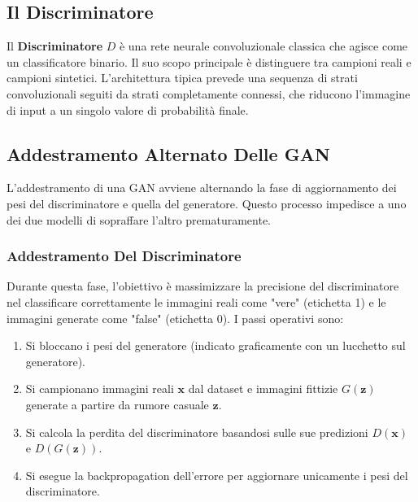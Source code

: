 ﻿\documentclass[11pt, a4paper]{article}
\begin{document}

\subsection{Il Discriminatore}

Il \textbf{Discriminatore} $D$ è una rete neurale convoluzionale classica che agisce come un classificatore binario. Il suo scopo principale è distinguere tra campioni reali e campioni sintetici. L'architettura tipica prevede una sequenza di strati convoluzionali seguiti da strati completamente connessi, che riducono l'immagine di input a un singolo valore di probabilità finale.


\subsection{Addestramento Alternato Delle GAN}

L'addestramento di una GAN avviene alternando la fase di aggiornamento dei pesi del discriminatore e quella del generatore. Questo processo impedisce a uno dei due modelli di sopraffare l'altro prematuramente.

\subsubsection{Addestramento Del Discriminatore}

Durante questa fase, l'obiettivo è massimizzare la precisione del discriminatore nel classificare correttamente le immagini reali come "vere" (etichetta 1) e le immagini generate come "false" (etichetta 0). I passi operativi sono:
\begin{enumerate}
    \item Si bloccano i pesi del generatore (indicato graficamente con un lucchetto sul generatore).
    \item Si campionano immagini reali $\bm{x}$ dal dataset e immagini fittizie $G(\bm{z})$ generate a partire da rumore casuale $\bm{z}$.
    \item Si calcola la perdita del discriminatore basandosi sulle sue predizioni $D(\bm{x})$ e $D(G(\bm{z}))$.
    \item Si esegue la backpropagation dell'errore per aggiornare unicamente i pesi del discriminatore.
\end{enumerate}
\end{document}
